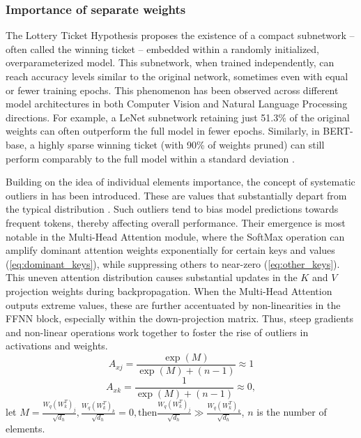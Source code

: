     \subsubsection{Importance of separate weights}
        The Lottery Ticket Hypothesis \cite{frankle2019lotterytickethypothesisfinding} proposes the existence of a compact subnetwork -- often called the winning ticket -- embedded within a randomly initialized, overparameterized model. This subnetwork, when trained independently, can reach accuracy levels similar to the original network, sometimes even with equal or fewer training epochs. This phenomenon has been observed across different model architectures in both Computer Vision and Natural Language Processing directions. For example, a LeNet subnetwork retaining just 51.3\% of the original weights can often outperform the full model in fewer epochs. Similarly, in BERT-base, a highly sparse winning ticket (with 90\% of weights pruned) can still perform comparably to the full model within a standard deviation \cite{chen2020lotterytickethypothesispretrained}.

        Building on the idea of individual elements importance, the concept of systematic outliers in \llms{} has been introduced. These are values that substantially depart from the typical distribution \cite{an2025systematicoutlierslargelanguage}. Such outliers tend to bias model predictions towards frequent tokens, thereby affecting overall performance. Their emergence is most notable in the Multi-Head Attention module, where the SoftMax operation can amplify dominant attention weights exponentially for certain keys and values (\ref{eq:dominant_keys}), while suppressing others to near-zero (\ref{eq:other_keys}). This uneven attention distribution causes substantial updates in the $K$ and $V$ projection weights during backpropagation. When the Multi-Head Attention  outputs extreme values, these are further accentuated by non-linearities in the FFNN block, especially within the down-projection matrix. Thus, steep gradients and non-linear operations work together to foster the rise of outliers in activations and weights.
        \begin{equation}\label{eq:dominant_keys}
        A_{xj} = \frac{\exp(M)}{\exp(M) + (n - 1)} \approx 1
        \end{equation}
        \begin{equation}\label{eq:other_keys}
        A_{xk} = \frac{1}{\exp(M) + (n - 1)} \approx 0,
        \end{equation}
        let \(M = \frac{W_q (W_k^T)_j}{\sqrt{d_h}}, \frac{W_q (W_k^T)_k}{\sqrt{d_h}} = 0, \text{then} \frac{W_q (W_k^T)_j}{\sqrt{d_h}} \gg \frac{W_q (W_k^T)_k}{\sqrt{d_h}}\), $n$ is the number of elements.

